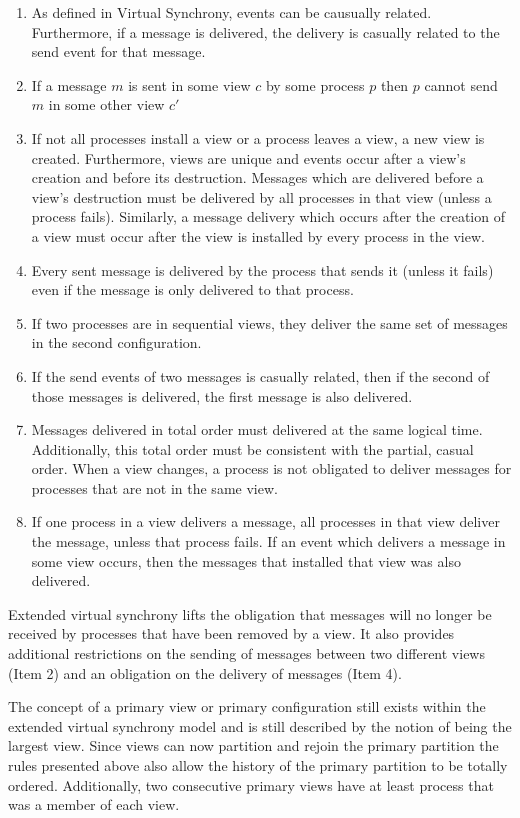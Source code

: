 \begin{enumerate}
	\item As defined in Virtual Synchrony, events can be causually related.
		Furthermore, if a message is delivered, the delivery is casually
		related to the send event for that message. 
	\item If a message $m$ is sent in some view $c$ by some process $p$ then $p$
		cannot send $m$ in some other view $c'$
	\item If not all processes install a view or a process leaves a view, a new
		view is created. Furthermore, views are unique and events occur after a
		view's creation and before its destruction. Messages which are delivered
		before a view's destruction must be delivered by all processes in that
		view (unless a process fails). Similarly, a message delivery which occurs
		after the creation of a view must occur after the view is installed by
		every process in the view.
	\item Every sent message is delivered by the process that sends it (unless it
		fails) even if the message is only delivered to that process.
	\item If two processes are in sequential views, they deliver the same set of
		messages in the second configuration.
	\item If the send events of two messages is casually related, then if the
		second of those messages is delivered, the first message is also delivered.
	\item Messages delivered in total order must delivered at the same logical time.
		Additionally, this total order must be consistent with the partial, casual
		order. When a view changes, a process is not obligated to deliver messages
		for processes that are not in the same view.
	\item If one process in a view delivers a message, all processes in that view
		deliver the message, unless that process fails. If an event which delivers
		a message in some view occurs, then the messages that installed that view
		was also delivered.
\end{enumerate}

Extended virtual synchrony lifts the obligation that messages will no longer be
received by processes that have been removed by a view. It also provides
additional restrictions on the sending of messages between two different views
(Item 2) and an obligation on the delivery of messages (Item 4). 

The concept of a primary view or primary configuration still exists within the
extended virtual synchrony model and is still described by the notion of being
the largest view. Since views can now partition and rejoin the primary partition
the rules presented above also allow the history of the primary partition to be
totally ordered. Additionally, two consecutive primary views have at least
process that was a member of each view.

